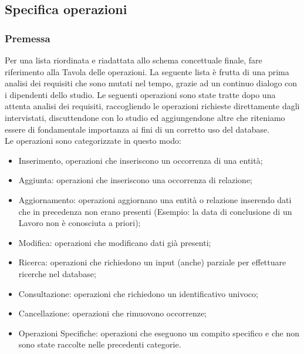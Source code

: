 \documentclass{elegantbook}
\begin{document}
	\subsection{Specifica operazioni}
	\subsubsection{Premessa}
        Per una lista riordinata e riadattata allo schema concettuale finale, fare riferimento alla Tavola delle operazioni. La seguente lista è frutta di una prima analisi dei requisiti che sono mutati nel tempo, grazie ad un continuo dialogo con i dipendenti dello studio.
	Le seguenti operazioni sono state tratte dopo una attenta analisi dei requisiti, raccogliendo le 
        operazioni richieste direttamente dagli intervistati, discuttendone con lo studio ed aggiungendone altre che riteniamo essere di fondamentale importanza ai fini di un corretto uso del database. \\
	Le operazioni sono categorizzate in questo modo:
	\begin{itemize}
		\item Inserimento, operazioni che inseriscono un occorrenza di una entità; 
		\item Aggiunta: operazioni che inseriscono una occorrenza di relazione; 
                \item Aggiornamento: operazioni aggiornano una entità o relazione inserendo dati che in precedenza non erano presenti (Esempio: la data di conclusione di un Lavoro non è conosciuta a priori);
		\item Modifica: operazioni che modificano dati già presenti;
                \item Ricerca: operazioni che richiedono un input (anche) parziale per effettuare ricerche nel database;
		\item Consultazione: operazioni che richiedono un identificativo univoco;
		\item Cancellazione: operazioni che rimuovono occorrenze;
		\item Operazioni Specifiche: operazioni che eseguono un compito specifico e che non sono state raccolte nelle precedenti categorie.
	\end{itemize}
	
\end{document}
